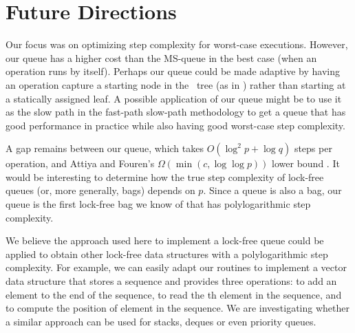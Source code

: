 
\section{Future Directions}

Our focus was on optimizing step complexity for worst-case executions.
However, our queue has a higher cost than the MS-queue in the best case (when an operation
runs by itself).
Perhaps our queue could be made adaptive by having an operation capture a starting node
in the \ordering\ tree (as in \cite{DBLP:conf/stoc/AfekDT95}) rather than starting at a statically assigned leaf.
A possible application of our queue  might be to use it as the slow path in the
fast-path slow-path methodology  \cite{10.1145/2370036.2145835} to
get a queue that has good performance in practice while also having good worst-case step complexity.

A gap remains between our queue, which takes $O(\log^2 p + \log q)$ steps per operation,
and Attiya and Fouren's $\Omega(\min(c,\log\log p))$ lower bound \cite{DBLP:conf/opodis/AttiyaF17}.
It would be interesting to determine how the true step complexity of lock-free queues (or, more generally, bags)
depends on $p$.
Since a queue is also a bag, our queue is the first lock-free bag we know of that has polylogarithmic step complexity.

We believe the approach used here to implement a lock-free queue 
could be applied to obtain other lock-free
data structures with a polylogarithmic step complexity.
For example, we can easily adapt our routines to implement a  vector data structure that stores a sequence and
provides three operations:  to add an element  to the end of the sequence,
 to read the th element in the sequence, and
 to compute the position of element  in the sequence.
We are investigating whether a similar approach can be used for stacks, deques or even priority queues.

